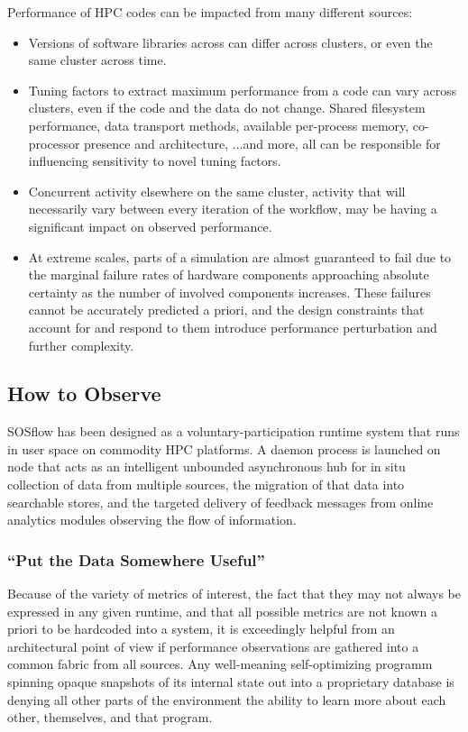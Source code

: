 Performance of HPC codes can be impacted from many different sources:
\begin{itemize}
    \item Versions of software libraries across can differ across
      clusters, or even the same cluster across time.
    \item Tuning factors to extract maximum performance from a code
      can vary across clusters, even if the code and the data do not
      change.
      Shared filesystem performance, data transport methods,
      available per-process memory, co-processor presence and
      architecture, ...and more, all can be responsible for
      influencing sensitivity to novel tuning factors.
    \item Concurrent activity elsewhere on the same cluster, activity
      that will necessarily vary between every iteration of the
      workflow, may be having a significant impact on observed
      performance.
    \item At extreme scales, parts of a simulation are almost
      guaranteed to fail due to the marginal failure rates of hardware
      components approaching absolute certainty as the number of
      involved components increases.
      These failures cannot be accurately predicted a priori, and
      the design constraints that account for and respond to them
      introduce performance perturbation and further complexity.
\end{itemize}


\subsection{How to Observe}
SOSflow has been designed as a voluntary-participation runtime system
that runs in user space on commodity HPC platforms.
%
A daemon process is launched on node that acts as an intelligent
unbounded asynchronous hub for in situ collection of data from
multiple sources, the migration of that data into searchable stores,
and the targeted delivery of feedback messages from online analytics
modules observing the flow of information.

\subsubsection{``Put the Data Somewhere Useful''}
Because of the variety of metrics of interest, the fact that they may
not always be expressed in any given runtime, and that all possible
metrics are not known a priori to be hardcoded into a system, it is
exceedingly helpful from an architectural point of view if performance
observations are gathered into a common fabric from all sources.
%
Any well-meaning self-optimizing programm spinning opaque snapshots of
its internal state out into a proprietary database is denying all
other parts of the environment the ability to learn more about each
other, themselves, and that program.


